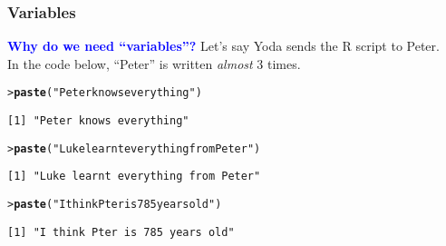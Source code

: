 \documentclass[13pt,aspectratio=169]{beamer}\usepackage[]{graphicx}\usepackage[]{color}
\makeatletter
\newcommand{\hlstr}[1]{\textcolor[rgb]{0.192,0.494,0.8}{#1}}%
\newcommand{\hlstd}[1]{\textcolor[rgb]{0.345,0.345,0.345}{#1}}%
\newcommand{\hlkwd}[1]{\textcolor[rgb]{0.737,0.353,0.396}{\textbf{#1}}}%
\newenvironment{kframe}{%
 \def\at@end@of@kframe{}%
 \ifinner\ifhmode%
  \def\at@end@of@kframe{\end{minipage}}%
  \begin{minipage}{\columnwidth}%
 \fi\fi%
 \def\FrameCommand##1{\hskip\@totalleftmargin \hskip-\fboxsep
 \colorbox{shadecolor}{##1}\hskip-\fboxsep
     \hskip-\linewidth \hskip-\@totalleftmargin \hskip\columnwidth}%
 \MakeFramed {\advance\hsize-\width
   \@totalleftmargin\z@ \linewidth\hsize
   \@setminipage}}%
 {\par\unskip\endMakeFramed%
 \at@end@of@kframe}
\newenvironment{knitrout}{}{} %
\newcommand{\tc}[2]{\textcolor{#1}{#2}}
\renewenvironment{knitrout}{\setlength{\topsep}{0mm}}{}
\makeatother
\begin{document}
\begin{frame}[fragile]
    \frametitle{Variables}
    \textbf{\tc{Blue}{Why do we need ``variables''?}}
    \vskip10pt
    Let's say Yoda sends the R script to Peter.\\
    In the code below, ``Peter'' is written \textit{almost} 3 times.

\begin{knitrout}\small
{}\color{fgcolor}\begin{kframe}
\begin{alltt}
\hlstd{> }\hlkwd{paste}\hlstd{(}\hlstr{"Peter knows everything"}\hlstd{)}
\end{alltt}
\begin{verbatim}
[1] "Peter knows everything"
\end{verbatim}
\begin{alltt}
\hlstd{> }\hlkwd{paste}\hlstd{(}\hlstr{"Luke learnt everything from Peter"}\hlstd{)}
\end{alltt}
\begin{verbatim}
[1] "Luke learnt everything from Peter"
\end{verbatim}
\begin{alltt}
\hlstd{> }\hlkwd{paste}\hlstd{(}\hlstr{"I think Pter is 785 years old"}\hlstd{)}
\end{alltt}
\begin{verbatim}
[1] "I think Pter is 785 years old"
\end{verbatim}
\end{kframe}
\end{knitrout}
\end{frame}
\end{document}
